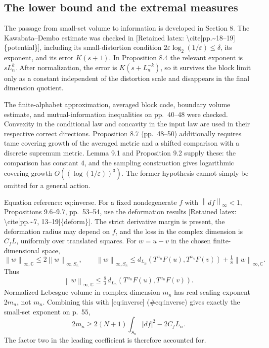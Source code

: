 \documentclass[10pt]{article}
\begin{document}
\subsection*{The lower bound and the extremal measures}
The passage from small-set volume to information is developed in Section 8. The Kawabata–Dembo estimate was checked in [Retained latex: \textbackslash{}cite[pp.\textasciitilde{}18--19]\{potential\}], including its small-distortion condition \(2\varepsilon\log_2(1/\varepsilon)\leq\delta\), its exponent, and its error \(K(s+1)\). In Proposition 8.4 the relevant exponent is \(sL_n^k\). After normalization, the error is \(K(s+L_n^{-k})\), so it survives the block limit only as a constant independent of the distortion scale and disappears in the final dimension quotient.\par
The finite-alphabet approximation, averaged block code, boundary volume estimate, and mutual-information inequalities on pp. 40–48 were checked. Convexity in the conditional law and concavity in the input law are used in their respective correct directions. Proposition 8.7 (pp. 48–50) additionally requires tame covering growth of the averaged metric and a shifted comparison with a discrete supremum metric. Lemma 9.1 and Proposition 9.2 supply these: the comparison has constant \(4\), and the sampling construction gives logarithmic covering growth \(O((\log(1/\varepsilon))^3)\). The former hypothesis cannot simply be omitted for a general action.\par
Equation reference: eq:inverse. For a fixed nondegenerate \(f\) with \(\left\lVert df\right\rVert_\infty<1\), Propositions 9.6–9.7, pp. 53–54, use the deformation results [Retained latex: \textbackslash{}cite[pp.\textasciitilde{}7, 13--19]\{deform\}]. The strict derivative margin is present, the deformation radius may depend on \(f\), and the loss in the complex dimension is \(C_fL\), uniformly over translated squares. For \(w=u-v\) in the chosen finite-dimensional space, \[\left\lVert w\right\rVert_{\infty,\mathbb C}\leq2\left\lVert w\right\rVert_{\infty,S_n},
 \qquad
 \left\lVert w\right\rVert_{\infty,S_n}\leq
 d_{L_n}(T^{a_n}F(u),T^{a_n}F(v))
       +\tfrac18\left\lVert w\right\rVert_{\infty,\mathbb C}.\] Thus \[
 \left\lVert w\right\rVert_{\infty,\mathbb C}
 \leq\tfrac83\,d_{L_n}(T^{a_n}F(u),T^{a_n}F(v)).\] Normalized Lebesgue volume in complex dimension \(m_n\) has real scaling exponent \(2m_n\), not \(m_n\). Combining this with [eq:inverse] (\#eq:inverse) gives exactly the small-set exponent on p. 55, \[2m_n\geq 2(N+1)\int_{S_n}|df|^2-2C_fL_n .\] The factor two in the leading coefficient is therefore accounted for.\par
\end{document}
